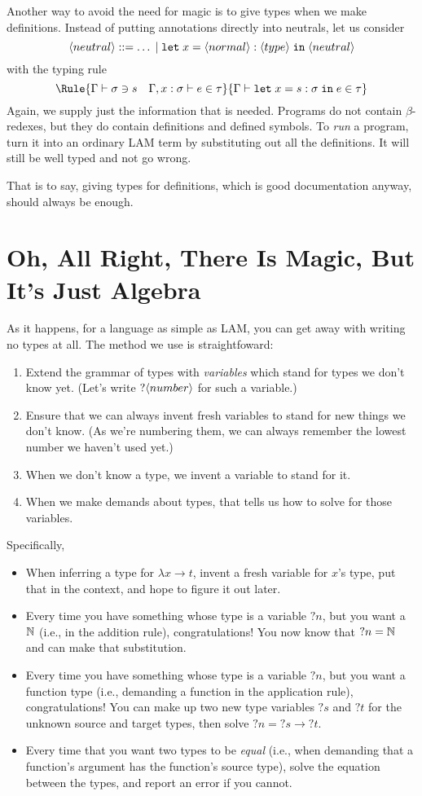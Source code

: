 \documentclass{article}
\begin{document}
Another way to avoid the need for magic is to give types when we make
definitions. Instead of putting annotations directly into neutrals, let us
consider
\[
  \langle neutral \rangle ::= \ldots \;|\; \mathtt{let}\;x=\langle normal \rangle:\langle type \rangle\;\mathtt{in}\; \langle neutral \rangle
\]
with the typing rule
\[\Rule{\Gamma\vdash \sigma\ni s\quad \Gamma,x:\sigma\vdash e\in\tau}
       {\Gamma\vdash \mathtt{let}\;x=s:\sigma\;\mathtt{in}\;e\in\tau}
\]
Again, we supply just the information that is needed. Programs do not
contain $\beta$-redexes, but they do contain definitions and defined
symbols. To \emph{run} a program, turn it into an ordinary LAM
term by substituting out all the definitions. It will still be well
typed and not go wrong.

That is to say, giving types for definitions, which is good documentation
anyway, should always be enough.


\section{Oh, All Right, There Is Magic, But It's Just Algebra}

As it happens, for a language as simple as LAM, you can get away with
writing no types at all. The method we use is straightfoward:
\begin{enumerate}
\item Extend the grammar of types with \emph{variables} which stand
  for types we don't know yet. (Let's write $?\langle number \rangle$ for such
  a variable.)
\item Ensure that we can always invent fresh variables to stand for
  new things we don't know. (As we're numbering them, we can always
  remember the lowest number we haven't used yet.)
\item When we don't know a type, we invent a variable to stand for it.
\item When we make demands about types, that tells us how to solve
  for those variables.
\end{enumerate}

Specifically,
\begin{itemize}
\item When inferring a type for $\lambda x\to t$, invent a fresh
  variable for $x$'s type, put that in the context, and hope to
  figure it out later.
\item Every time you have something whose type is a variable $?n$,
  but you want a $\mathbb{N}$ (i.e., in the addition rule), congratulations! You now know that
  $?n=\mathbb{N}$ and can make that substitution.
\item Every time you have something whose type is a variable $?n$,
  but you want a function type (i.e., demanding a function in the application rule), congratulations! You can make up
  two new type variables $?s$ and $?t$ for the unknown source and target
  types, then solve $?n=?s\to?t$.
\item Every time that you want two types to be \emph{equal} (i.e., when demanding
  that a function's argument has the function's source type), solve the
  equation between the types, and report an error if you cannot.
\end{itemize}
\end{document}
